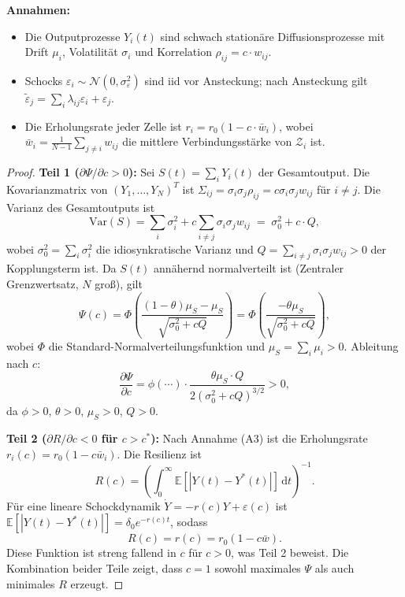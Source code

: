 ﻿\documentclass[a4paper,12pt]{article}
\theoremstyle{definition}
\begin{document}
\noindent\textbf{Annahmen:}
\begin{itemize}
    \item[(A1)] Die Outputprozesse $Y_i(t)$ sind schwach stationäre Diffusionsprozesse mit
          Drift $\mu_i$, Volatilität $\sigma_i$ und Korrelation $\rho_{ij} = c \cdot w_{ij}$.
    \item[(A2)] Schocks $\varepsilon_i \sim \mathcal{N}(0, \sigma_\varepsilon^2)$ sind
          iid vor Ansteckung; nach Ansteckung gilt
          $\tilde{\varepsilon}_j = \sum_i \lambda_{ij} \varepsilon_i + \varepsilon_j$.
    \item[(A3)] Die Erholungsrate jeder Zelle ist $r_i = r_0 (1 - c \cdot \bar{w}_i)$,
          wobei $\bar{w}_i = \frac{1}{N-1}\sum_{j\neq i} w_{ij}$ die mittlere
          Verbindungsstärke von $\mathcal{Z}_i$ ist.
\end{itemize}

\begin{proof}
    \textbf{Teil 1 ($\partial\Psi/\partial c > 0$):}
    Sei $S(t) = \sum_i Y_i(t)$ der Gesamtoutput. Die Kovarianzmatrix von
    $(Y_1,\ldots,Y_N)^T$ ist $\Sigma_{ij} = \sigma_i \sigma_j \rho_{ij} = c \sigma_i \sigma_j w_{ij}$
    für $i \neq j$. Die Varianz des Gesamtoutputs ist
    \[
        \mathrm{Var}(S) = \sum_i \sigma_i^2 + c \sum_{i\neq j} \sigma_i \sigma_j w_{ij}
        \;=\; \sigma_0^2 + c \cdot Q,
    \]
    wobei $\sigma_0^2 = \sum_i \sigma_i^2$ die idiosynkratische Varianz und
    $Q = \sum_{i\neq j} \sigma_i \sigma_j w_{ij} > 0$ der Kopplungsterm ist.
    Da $S(t)$ annähernd normalverteilt ist (Zentraler Grenzwertsatz, $N$ groß), gilt
    \[
        \Psi(c) = \Phi\!\left(\frac{(1-\theta)\mu_S - \mu_S}{\sqrt{\sigma_0^2 + c Q}}\right)
        = \Phi\!\left(\frac{-\theta\mu_S}{\sqrt{\sigma_0^2 + c Q}}\right),
    \]
    wobei $\Phi$ die Standard-Normalverteilungsfunktion und $\mu_S = \sum_i \mu_i > 0$.
    Ableitung nach $c$:
    \[
        \frac{\partial \Psi}{\partial c}
        = \phi\!\left(\cdots\right) \cdot \frac{\theta \mu_S \cdot Q}{2(\sigma_0^2 + cQ)^{3/2}}
        > 0,
    \]
    da $\phi > 0$, $\theta > 0$, $\mu_S > 0$, $Q > 0$.

    \textbf{Teil 2 ($\partial R/\partial c < 0$ für $c > c^*$):}
    Nach Annahme (A3) ist die Erholungsrate $r_i(c) = r_0(1-c\bar{w}_i)$. Die Resilienz ist
    \[
        R(c) = \left(\int_0^\infty \mathbb{E}[|Y(t) - Y^*(t)|]\,\mathrm{d}t\right)^{-1}.
    \]
    Für eine lineare Schockdynamik $\dot{Y} = -r(c) Y + \varepsilon(c)$ ist
    $\mathbb{E}[|Y(t)-Y^*(t)|] = \delta_0 e^{-r(c)t}$, sodass
    \[
        R(c) = r(c) = r_0(1 - c\bar{w}).
    \]
    Diese Funktion ist streng fallend in $c$ für $c > 0$, was Teil 2 beweist.
    Die Kombination beider Teile zeigt, dass $c=1$ sowohl maximales $\Psi$ als auch
    minimales $R$ erzeugt.
\end{proof}
\end{document}
